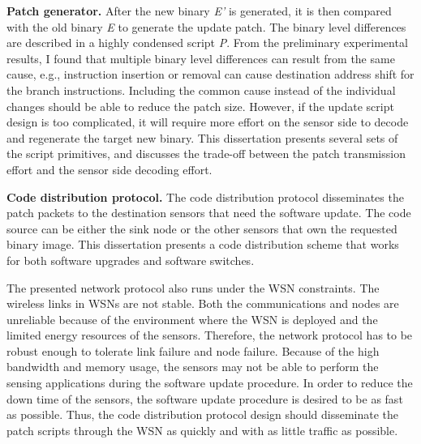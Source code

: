 \textbf{Patch generator.}
After the new binary {\it E'} is generated, it is then compared with the old binary {\it E} to generate the update patch. The binary level differences are described in a highly condensed script {\it P}. 
From the preliminary experimental results, I found that multiple binary level differences can result from the same cause, e.g., instruction insertion or removal can cause destination address shift for the branch instructions.
Including the common cause instead of the individual changes should be able to reduce the patch size.
However, if the update script design is too complicated, it will require more effort on the sensor side to decode and regenerate the target new binary.
This dissertation presents several sets of the script primitives, and discusses the trade-off between the patch transmission effort and the sensor side decoding effort.


\textbf{Code distribution protocol.}
The code distribution protocol disseminates the patch packets to the destination sensors that need the software update. The code source can be either the sink node or the other sensors that own the requested binary image.
This dissertation presents 
a code distribution scheme that works for both software upgrades and software switches.

The presented network protocol also runs under the WSN constraints.
The wireless links in WSNs are not stable. Both the communications and nodes are unreliable because of the environment where the WSN is deployed and the limited energy resources of the sensors. Therefore, the network protocol has to be robust enough to tolerate link failure and node failure.
Because of the high bandwidth and memory usage, the sensors may not be able to perform the sensing applications during the software update procedure. In order to reduce the down time of the sensors, the software update procedure is desired to be as fast as possible. 
Thus, the code distribution protocol design should disseminate the patch scripts through the WSN as quickly and with as little traffic as possible.

